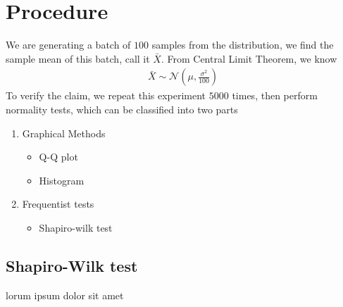 \documentclass{article}
\begin{document}
\section{Procedure}
We are generating a batch of $100$ samples from the distribution, we find the sample mean of this batch, call it $\bar{X}$. From Central Limit Theorem, we know
\begin{align}
    \bar{X} \sim \mathcal{N}(\mu, \frac{\sigma^2}{100})
\end{align}
To verify the claim, we repeat this experiment $5000$ times, then perform normality tests, which can be classified into two parts
\begin{enumerate}
    \item Graphical Methods
    \begin{itemize}
        \item Q-Q plot
        \item Histogram
    \end{itemize}
    \item{Frequentist tests}
    \begin{itemize}
        \item Shapiro-wilk test
    \end{itemize}
\end{enumerate}

\subsection{Shapiro-Wilk test}
lorum ipsum dolor sit amet
\end{document}
